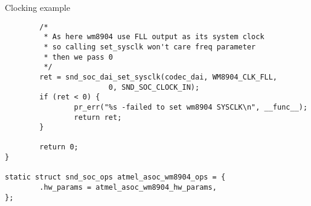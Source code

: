 \begin{frame}[fragile]{Clocking example}
  \begin{block}{}
    \fontsize{9}{9}\selectfont
    \begin{verbatim}
        /*
         * As here wm8904 use FLL output as its system clock
         * so calling set_sysclk won't care freq parameter
         * then we pass 0
         */
        ret = snd_soc_dai_set_sysclk(codec_dai, WM8904_CLK_FLL,
                        0, SND_SOC_CLOCK_IN);
        if (ret < 0) {
                pr_err("%s -failed to set wm8904 SYSCLK\n", __func__);
                return ret;
        }

        return 0;
}

static struct snd_soc_ops atmel_asoc_wm8904_ops = {
        .hw_params = atmel_asoc_wm8904_hw_params,
};
    \end{verbatim}
  \end{block}
\end{frame}
